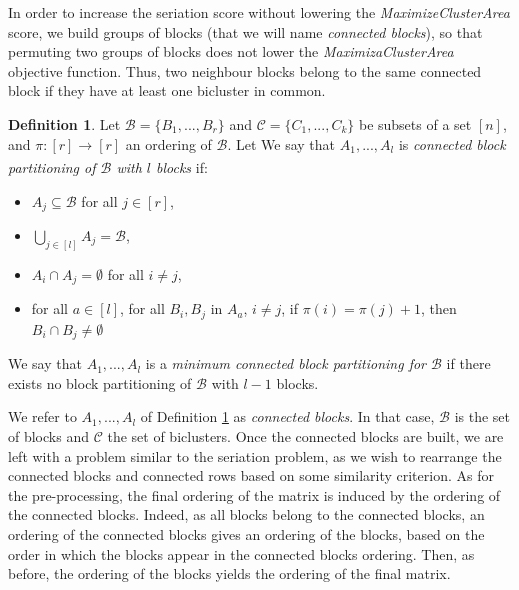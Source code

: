 \documentclass[twoside,leqno,twocolumn]{article}
\theoremstyle{definition}
\newtheorem{definition}{Definition}[section]
\begin{document}
\bigskip

\noindent In order to increase the seriation score without lowering the \textit{MaximizeClusterArea} score, we build groups of blocks (that we will name \textit{connected blocks}), so that permuting two groups of blocks does not lower the \textit{MaximizaClusterArea} objective function. Thus, two neighbour blocks belong to the same connected block if they have at least one bicluster in common.
\medskip

\begin{definition}
\label{def:connectedblocks}
Let $\mathcal{B} = \{B_1,...,B_r\}$ and $\mathcal{C} = \{C_1,...,C_k\}$ be subsets of a set $[n]$, and $\pi:[r]\xrightarrow[]{}[r]$ an ordering of $\mathcal{B}$. Let  We say that $A_1,...,A_l$ is \emph{connected block partitioning of $\mathcal{B}$ with $l$ blocks} if:
\begin{itemize}
\item  $A_j \subseteq \mathcal{B}$ for all $j \in [r]$,
\item $\bigcup_{j \in [l]} A_j = \mathcal{B}$,
\item $A_i \cap A_j = \emptyset$ for all $i \neq j$,
\item for all $a \in [l]$, for all $B_i,B_j$ in $A_a$, $i\neq j$, if $\pi(i) = \pi(j)+1$, then $B_i \cap B_j \neq \emptyset$
\end{itemize}
 We say that $A_1,...,A_l$ is a \emph{minimum connected block partitioning for $\mathcal{B}$} if there exists no block partitioning of $\mathcal{B}$ with $l-1$ blocks.
\end{definition}


\medskip

\noindent We refer to $A_1,...,A_l$ of Definition \ref{def:connectedblocks} as \emph{connected blocks}. In that case, $\mathcal{B}$ is the set of blocks and $\mathcal{C}$ the set of biclusters. Once the connected blocks are built, we are left with a problem similar to the seriation problem, as we wish to rearrange the connected blocks and connected rows based on some similarity criterion. As for the pre-processing, the final ordering of the matrix is induced by the ordering of the connected blocks. Indeed, as all blocks belong to the connected blocks, an ordering of the connected blocks gives an ordering of the blocks, based on the order in which the blocks appear in the connected blocks ordering. Then, as before, the ordering of the blocks yields the ordering of the final matrix. %
\end{document}
